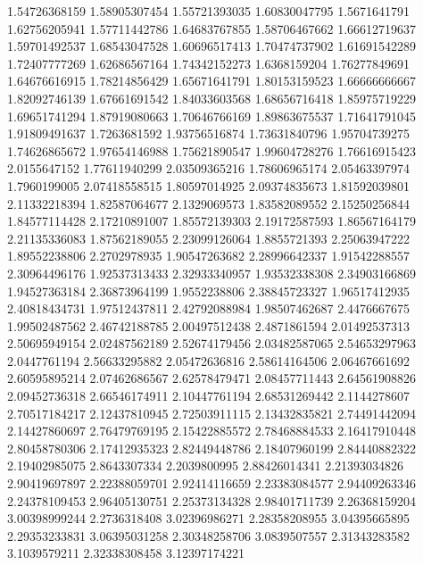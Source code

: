   1.54726368159    1.58905307454
  1.55721393035    1.60830047795
   1.5671641791    1.62756205941
  1.57711442786    1.64683767855
  1.58706467662    1.66612719637
  1.59701492537    1.68543047528
  1.60696517413    1.70474737902
  1.61691542289    1.72407777269
  1.62686567164    1.74342152273
   1.6368159204    1.76277849691
  1.64676616915    1.78214856429
  1.65671641791    1.80153159523
  1.66666666667    1.82092746139
  1.67661691542    1.84033603568
  1.68656716418    1.85975719229
  1.69651741294    1.87919080663
  1.70646766169    1.89863675537
  1.71641791045    1.91809491637
   1.7263681592    1.93756516874
  1.73631840796    1.95704739275
  1.74626865672    1.97654146988
  1.75621890547    1.99604728276
  1.76616915423     2.0155647152
  1.77611940299    2.03509365216
  1.78606965174    2.05463397974
   1.7960199005    2.07418558515
  1.80597014925    2.09374835673
  1.81592039801    2.11332218394
  1.82587064677     2.1329069573
  1.83582089552    2.15250256844
  1.84577114428    2.17210891007
  1.85572139303    2.19172587593
  1.86567164179    2.21135336083
  1.87562189055    2.23099126064
   1.8855721393    2.25063947222
  1.89552238806     2.2702978935
  1.90547263682    2.28996642337
  1.91542288557    2.30964496176
  1.92537313433    2.32933340957
  1.93532338308    2.34903166869
  1.94527363184    2.36873964199
   1.9552238806    2.38845723327
  1.96517412935    2.40818434731
  1.97512437811    2.42792088984
  1.98507462687     2.4476667675
  1.99502487562    2.46742188785
  2.00497512438     2.4871861594
  2.01492537313    2.50695949154
  2.02487562189    2.52674179456
  2.03482587065    2.54653297963
   2.0447761194    2.56633295882
  2.05472636816    2.58614164506
  2.06467661692    2.60595895214
  2.07462686567    2.62578479471
  2.08457711443    2.64561908826
  2.09452736318    2.66546174911
  2.10447761194    2.68531269442
   2.1144278607    2.70517184217
  2.12437810945    2.72503911115
  2.13432835821    2.74491442094
  2.14427860697    2.76479769195
  2.15422885572    2.78468884533
  2.16417910448    2.80458780306
  2.17412935323    2.82449448786
  2.18407960199    2.84440882322
  2.19402985075     2.8643307334
   2.2039800995    2.88426014341
  2.21393034826    2.90419697897
  2.22388059701    2.92414116659
  2.23383084577    2.94409263346
  2.24378109453    2.96405130751
  2.25373134328    2.98401711739
  2.26368159204    3.00398999244
   2.2736318408    3.02396986271
  2.28358208955    3.04395665895
  2.29353233831    3.06395031258
  2.30348258706     3.0839507557
  2.31343283582     3.1039579211
  2.32338308458    3.12397174221
